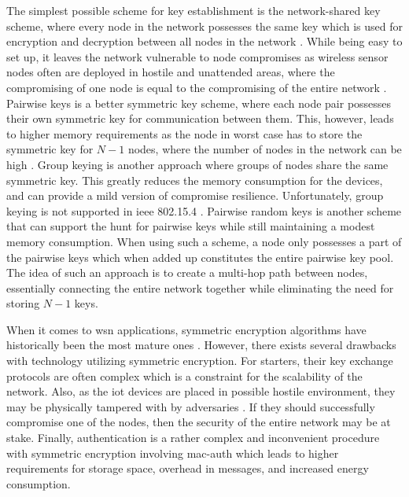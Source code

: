 
The simplest possible scheme for key establishment is the network-shared key scheme, where every node in the network possesses the same key which is used for encryption and decryption between all nodes in the network \cite{perrig2004security}. While being easy to set up, it leaves the network vulnerable to node compromises as wireless sensor nodes often are deployed in hostile and unattended areas, where the compromising of one node is equal to the compromising of the entire network \cite{krentz20136lowpan}. Pairwise keys is a better symmetric key scheme, where each node pair possesses their own symmetric key for communication between them. This, however, leads to higher memory requirements as the node in worst case has to store the symmetric key for $N-1$ nodes, where the number of nodes in the network can be high \cite{perrig2004security}. Group keying is another approach where groups of nodes share the same symmetric key. This greatly reduces the memory consumption for the devices, and can provide a mild version of compromise resilience. Unfortunately, group keying is not supported in \gls{ieee} 802.15.4 \cite{sastry2004security}. Pairwise random keys is another scheme that can support the hunt for pairwise keys while still maintaining a modest memory consumption. When using such a scheme, a node only possesses a part of the pairwise keys which when added up constitutes the entire pairwise key pool. The idea of such an approach is to create a multi-hop path between nodes, essentially connecting the entire network together while eliminating the need for storing $N-1$ keys.



When it comes to \gls{wsn} applications, symmetric encryption algorithms have historically been the most mature ones \citep{Jing2014}. However, there exists several drawbacks with technology utilizing symmetric encryption. For starters, their key exchange protocols are often complex which is a constraint for the scalability of the network. Also, as the \gls{iot} devices are placed in possible hostile environment, they may be physically tampered with by adversaries \cite{krentz20136lowpan}. If they should successfully compromise one of the nodes, then the security of the entire network may be at stake. Finally, authentication is a rather complex and inconvenient procedure with symmetric encryption involving \gls{mac-auth} which leads to higher requirements for storage space, overhead in messages, and increased energy consumption.

